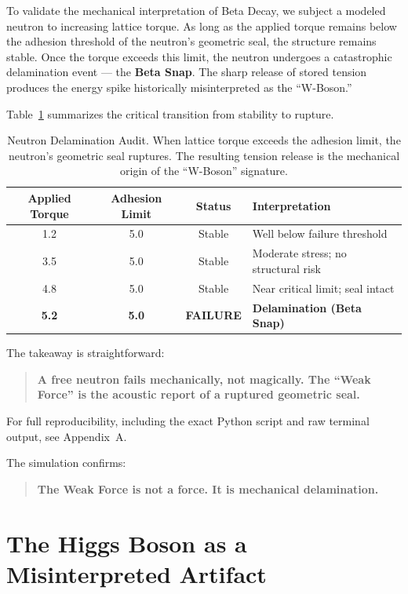 \documentclass[11pt, letterpaper, openany]{book}
\begin{document}
To validate the mechanical interpretation of Beta Decay, we subject a modeled neutron to increasing
lattice torque. As long as the applied torque remains below the adhesion threshold of the neutron’s
geometric seal, the structure remains stable. Once the torque exceeds this limit, the neutron
undergoes a catastrophic delamination event — the \textbf{Beta Snap}. The sharp release of stored
tension produces the energy spike historically misinterpreted as the ``W-Boson.''

Table~\ref{tab:delamination_audit} summarizes the critical transition from stability to rupture.

\begin{table}[H]
\centering
\begin{tabular}{|c|c|c|l|}
\hline
\textbf{Applied Torque} & \textbf{Adhesion Limit} & \textbf{Status} & \textbf{Interpretation} \\ \hline
1.2 & 5.0 & Stable & Well below failure threshold \\ \hline
3.5 & 5.0 & Stable & Moderate stress; no structural risk \\ \hline
4.8 & 5.0 & Stable & Near critical limit; seal intact \\ \hline
\textbf{5.2} & \textbf{5.0} & \textbf{FAILURE} & \textbf{Delamination (Beta Snap)} \\ \hline
\end{tabular}
\caption{Neutron Delamination Audit. When lattice torque exceeds the adhesion limit, the neutron’s geometric seal ruptures. The resulting tension release is the mechanical origin of the ``W-Boson'' signature.}
\label{tab:delamination_audit}
\end{table}

The takeaway is straightforward:

\begin{quote}
\textbf{A free neutron fails mechanically, not magically.  
The ``Weak Force'' is the acoustic report of a ruptured geometric seal.}
\end{quote}

For full reproducibility, including the exact Python script and raw terminal output, see Appendix~A.


The simulation confirms:

\begin{quote}
\textbf{The Weak Force is not a force.  
It is mechanical delamination.}
\end{quote}

\section{The Higgs Boson as a Misinterpreted Artifact}
\end{document}
